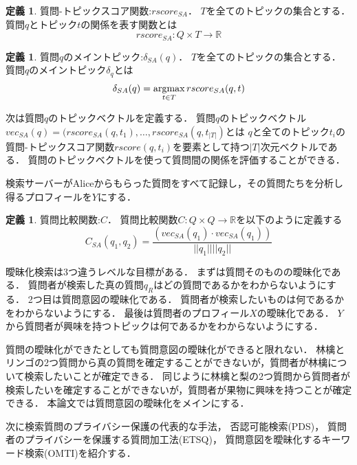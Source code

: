 \documentclass[master]{suribt}
\theoremstyle{definition}
\newtheorem{defi}[thm]{定義}
\newcommand{\argmax}{\mathop{\rm argmax}\limits}
\begin{document}
 \begin{defi}{質問-トピックスコア関数:$rscore_{SA}$．}
  $T$を全てのトピックの集合とする．
  質問$q$とトピック$t$の関係を表す関数とは
  \begin{equation}
   rscore_{SA}:Q \times T \to \mathbb{R}
  \end{equation}
 \end{defi}

 \begin{defi}{質問$q$のメイントピック:$\delta_{SA}(q)$．}
  $T$を全てのトピックの集合とする．
  質問$q$のメイントピック$\delta_q$とは
  \begin{equation}
   \delta_{SA}(q) = \argmax_{t \in T} rscore_{SA}(q,t)
  \end{equation}
 \end{defi}

 次は質問$q$のトピックベクトルを定義する．
 質問$q$のトピックベクトル$vec_{SA}(q) = (rscore_{SA}(q,t_1 ), \dots , rscore_{SA}(q,t_{|T|})$とは
 $q$と全てのトピック$t_i$の質問-トピックスコア関数$rscore(q, t_i)$を要素として持つ$|T|$次元ベクトルである．
 質問のトピックベクトルを使って質問間の関係を評価することができる．

 検索サーバーがAliceからもらった質問をすべて記録し，その質問たちを分析し得るプロフィールを$Y$にする．

 \begin{defi}{質問比較関数:$C$．}
  質問比較関数$C:Q \times Q \rightarrow \mathbb{R}$を以下のように定義する
  \begin{equation}
  C_{SA}(q_1,q_2) = \frac{(vec_{SA}(q_1) \cdot vec_{SA}(q_1))}{||q_1|| ||q_2||}
  \end{equation}
 \end{defi}
 
 
 曖昧化検索は3つ違うレベルな目標がある．
 まずは質問そのものの曖昧化である．
 質問者が検索した真の質問$q_R$はどの質問であるかをわからないようにする．
 2つ目は質問意図の曖昧化である．
 質問者が検索したいものは何であるかをわからないようにする．
 最後は質問者のプロフィール$X$の曖昧化である．
 $Y$から質問者が興味を持つトピックは何であるかをわからないようにする．
 
 質問の曖昧化ができたとしても質問意図の曖昧化ができると限れない．
 {林檎}と{リンゴ}の2つ質問から真の質問を確定することができないが，質問者が林檎について検索したいことが確定できる．
 同じように{林檎}と{梨}の2つ質問から質問者が検索したいを確定することができないが，質問者が果物に興味を持つことが確定できる．
 本論文では質問意図の曖昧化をメインにする．

 次に検索質問のプライバシー保護の代表的な手法，
 否認可能検索(PDS)\cite{providing2009}，
 質問者のプライバシーを保護する質問加工法(ETSQ)\cite{embellishing2010}，
 質問意図を曖昧化するキーワード検索(OMTI)\cite{masking2014}を紹介する．
 
\end{document}
